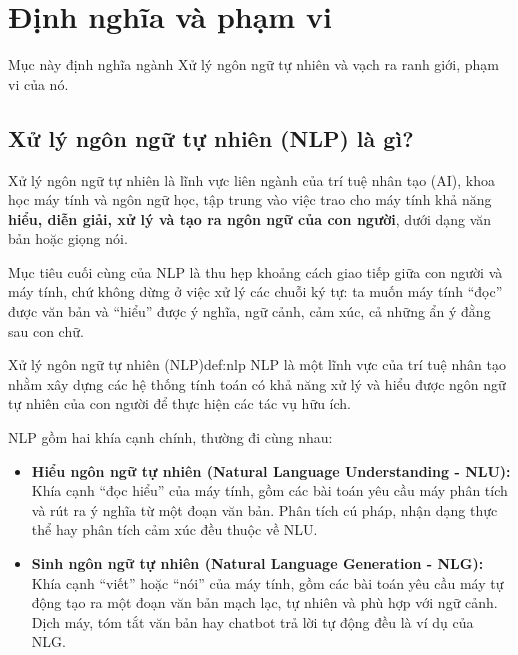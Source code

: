 

\section{Định nghĩa và phạm vi}
\label{sec:dinh_nghia_pham_vi}

Mục này định nghĩa ngành Xử lý ngôn ngữ tự nhiên và vạch ra ranh giới, phạm vi của nó.

\subsection{Xử lý ngôn ngữ tự nhiên (NLP) là gì?}
\label{ssec:nlp_la_gi}

Xử lý ngôn ngữ tự nhiên là lĩnh vực liên ngành của trí tuệ nhân tạo (AI), khoa học máy tính và ngôn ngữ học, tập trung vào việc trao cho máy tính khả năng \textbf{hiểu, diễn giải, xử lý và tạo ra ngôn ngữ của con người}, dưới dạng văn bản hoặc giọng nói.

Mục tiêu cuối cùng của NLP là thu hẹp khoảng cách giao tiếp giữa con người và máy tính, chứ không dừng ở việc xử lý các chuỗi ký tự: ta muốn máy tính “đọc” được văn bản và “hiểu” được ý nghĩa, ngữ cảnh, cảm xúc, cả những ẩn ý đằng sau con chữ.

\begin{definition}{Xử lý ngôn ngữ tự nhiên (NLP)}{def:nlp}
    NLP là một lĩnh vực của trí tuệ nhân tạo nhằm xây dựng các hệ thống tính toán có khả năng xử lý và hiểu được ngôn ngữ tự nhiên của con người để thực hiện các tác vụ hữu ích.
\end{definition}

NLP gồm hai khía cạnh chính, thường đi cùng nhau:

\begin{itemize}
    \item \textbf{Hiểu ngôn ngữ tự nhiên (Natural Language Understanding - NLU):} Khía cạnh “đọc hiểu” của máy tính, gồm các bài toán yêu cầu máy phân tích và rút ra ý nghĩa từ một đoạn văn bản. Phân tích cú pháp, nhận dạng thực thể hay phân tích cảm xúc đều thuộc về NLU.
    
    \item \textbf{Sinh ngôn ngữ tự nhiên (Natural Language Generation - NLG):} Khía cạnh “viết” hoặc “nói” của máy tính, gồm các bài toán yêu cầu máy tự động tạo ra một đoạn văn bản mạch lạc, tự nhiên và phù hợp với ngữ cảnh. Dịch máy, tóm tắt văn bản hay chatbot trả lời tự động đều là ví dụ của NLG.
\end{itemize}


